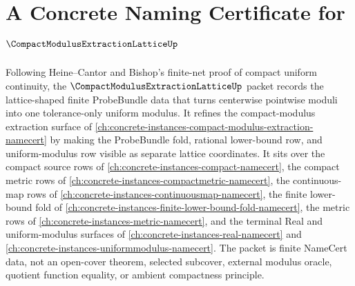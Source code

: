 \chapter{A Concrete Naming Certificate for $\CompactModulusExtractionLatticeUp$}
\label{ch:concrete-instances-compact-modulus-extraction-lattice-namecert}

Following Heine--Cantor and Bishop's finite-net proof of compact uniform continuity, the $\CompactModulusExtractionLatticeUp$ packet records the lattice-shaped finite ProbeBundle data that turns centerwise pointwise moduli into one tolerance-only uniform modulus. It refines the compact-modulus extraction surface of \autoref{ch:concrete-instances-compact-modulus-extraction-namecert} by making the ProbeBundle fold, rational lower-bound row, and uniform-modulus row visible as separate lattice coordinates. It sits over the compact source rows of \autoref{ch:concrete-instances-compact-namecert}, the compact metric rows of \autoref{ch:concrete-instances-compactmetric-namecert}, the continuous-map rows of \autoref{ch:concrete-instances-continuousmap-namecert}, the finite lower-bound fold of \autoref{ch:concrete-instances-finite-lower-bound-fold-namecert}, the metric rows of \autoref{ch:concrete-instances-metric-namecert}, and the terminal Real and uniform-modulus surfaces of \autoref{ch:concrete-instances-real-namecert} and \autoref{ch:concrete-instances-uniformmodulus-namecert}. The packet is finite NameCert data, not an open-cover theorem, selected subcover, external modulus oracle, quotient function equality, or ambient compactness principle.

